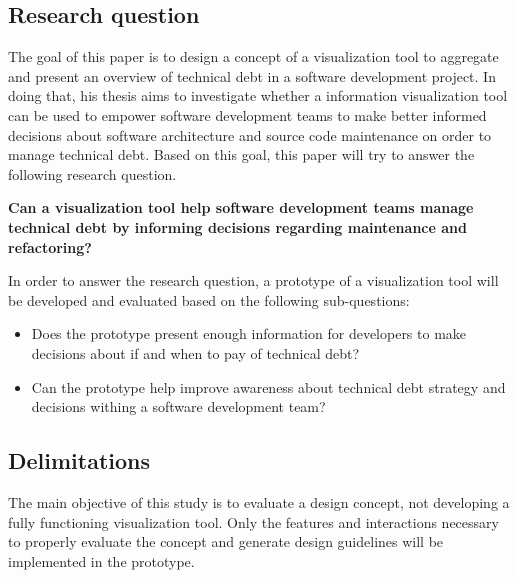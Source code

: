 \subsection{Research question}

The goal of this paper is to design a concept of a visualization tool to aggregate and present an overview of technical debt in a software development project.
In doing that, his thesis aims to investigate whether a information visualization tool can be used to empower software development teams to make better informed decisions about software architecture and source code maintenance on order to manage technical debt.
Based on this goal, this paper will try to answer the following research question.

\smallskip
\textbf{
Can a visualization tool help software development teams manage technical debt by informing decisions regarding maintenance and refactoring?
}
\smallskip

In order to answer the research question, a prototype of a visualization tool will be developed and evaluated based on the following sub-questions:
\begin{itemize}
\item Does the prototype present enough information for developers to make decisions about if and when to pay of technical debt?
\item Can the prototype help improve awareness about technical debt strategy and decisions withing a software development team?
\end{itemize}

\subsection{Delimitations}
The main objective of this study is to evaluate a design concept, not developing a fully functioning visualization tool.
Only the features and interactions necessary to properly evaluate the concept and generate design guidelines will be implemented in the prototype.